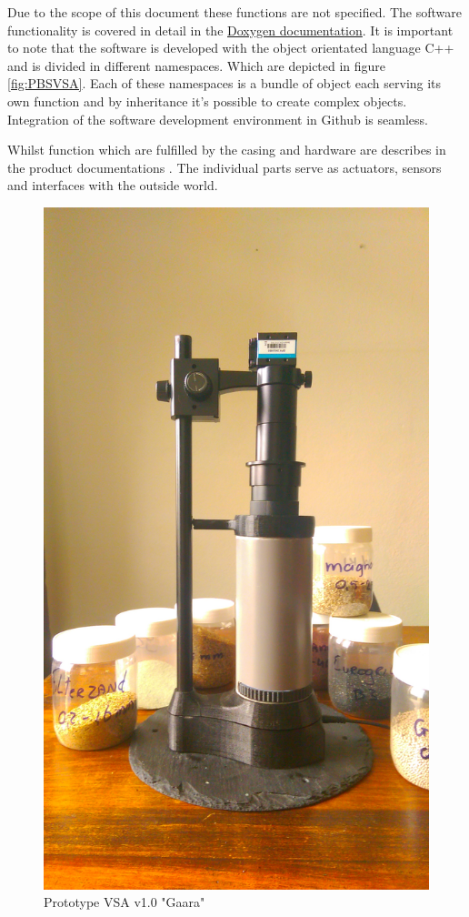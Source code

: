\documentclass[fleqn,10pt]{SelfArx} %
\begin{document}
Due to the scope of this document these functions are not specified. The software functionality is covered in detail in the \href{http://peer23peer.github.io/VisionSoilAnalyzer/Doxygen/html/index.html}{\color{color1}Doxygen documentation}. It is important to note that the software is developed with the object orientated language C++ and is divided in different namespaces. Which are depicted in figure \ref{fig:PBSVSA}. Each of these namespaces is a bundle of object each serving its own function and by inheritance it's possible to create complex objects. Integration of the software development environment in Github is seamless.

Whilst function which are fulfilled by the casing and hardware are describes in the product documentations \cite{jelle_spijker_vision_2015}. The individual parts serve as actuators, sensors and interfaces with the outside world.

\begin{figure}[h]
	\includegraphics[width=\textwidth/2]{../images/FinalPrototype.jpg}
	\caption{Prototype VSA v1.0 "Gaara"}\label{fig:VSA Prototype}
\end{figure}
\end{document}
